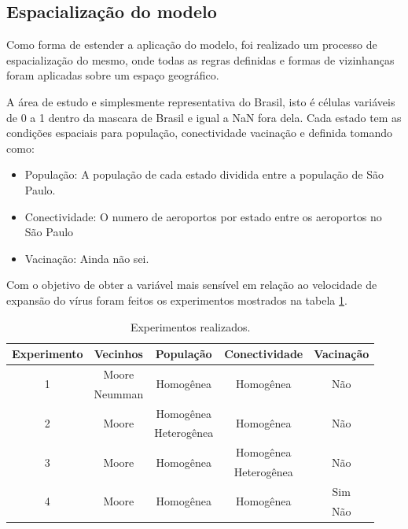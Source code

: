 \documentclass[a4paper,12pt]{article}
\begin{document}


\newpage
\subsection{Espacialização do modelo}

Como forma de estender a aplicação do modelo, foi realizado um processo de espacialização do mesmo, onde todas as regras definidas e formas de vizinhanças foram aplicadas sobre um espaço geográfico. 

A área de estudo e simplesmente representativa do Brasil, isto é células variáveis de 0 a 1 dentro da mascara de Brasil e igual a NaN fora dela. Cada estado tem as condições espaciais para população, conectividade vacinação e definida tomando como:

\begin{itemize}
    \item População: A população de cada estado dividida entre a população de São Paulo.
    \item Conectividade: O numero de aeroportos por estado entre os aeroportos no São Paulo
    \item Vacinação: Ainda não sei.
\end{itemize}

Com o objetivo de obter a variável mais sensível em relação ao velocidade de expansão do vírus foram feitos os experimentos mostrados na tabela \ref{tab:exp}.

\begin{table}[ht]
 \caption{Experimentos realizados.}
 \centering
 \begin{tabular}{c|c|c|c|c}
  Experimento & Vecinhos & População & Conectividade & Vacinação \\
  \hline
  \multirow{2}{*}{1} & Moore & \multirow{2}{*}{Homogênea} & \multirow{2}{*}{Homogênea} & \multirow{2}{*}{Não} \\
   & Neumman &  &  &  \\
  \hline
  \multirow{2}{*}{2} & \multirow{2}{*}{Moore} & Homogênea & \multirow{2}{*}{Homogênea} & \multirow{2}{*}{Não} \\
  &  & Heterogênea &  &  \\
  \hline
  \multirow{2}{*}{3} & \multirow{2}{*}{Moore} & \multirow{2}{*}{Homogênea} & Homogênea & \multirow{2}{*}{Não} \\
  &  &  & Heterogênea &  \\
  \hline
  \multirow{2}{*}{4} & \multirow{2}{*}{Moore} & \multirow{2}{*}{Homogênea} & \multirow{2}{*}{Homogênea} & Sim \\
  &  &  &  & Não \\
\end{tabular}
\label{tab:exp}
\end{table}
\end{document}
